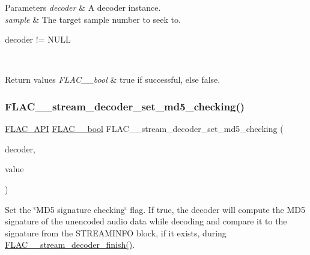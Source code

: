 \begin{DoxyParams}{Parameters}
{\em decoder} & A decoder instance. \\
\hline
{\em sample} & The target sample number to seek to.  
\begin{DoxyCode}
decoder != NULL 
\end{DoxyCode}
 \\
\hline
\end{DoxyParams}

\begin{DoxyRetVals}{Return values}
{\em F\+L\+A\+C\+\_\+\+\_\+bool} & {\ttfamily true} if successful, else {\ttfamily false}. \\
\hline
\end{DoxyRetVals}
\mbox{\label{group__flac__stream__decoder_ga48074d18a17ea88e8272cc8f865ae6e6}} 
\subsubsection{\texorpdfstring{F\+L\+A\+C\+\_\+\+\_\+stream\+\_\+decoder\+\_\+set\+\_\+md5\+\_\+checking()}{FLAC\_\_stream\_decoder\_set\_md5\_checking()}}
{\footnotesize\ttfamily \hyperlink{group__flac__export_ga56ca07df8a23310707732b1c0007d6f5}{F\+L\+A\+C\+\_\+\+A\+PI} \hyperlink{ordinals_8h_a95103469f1cbd78b8cf250194985b34e}{F\+L\+A\+C\+\_\+\+\_\+bool} F\+L\+A\+C\+\_\+\+\_\+stream\+\_\+decoder\+\_\+set\+\_\+md5\+\_\+checking (\begin{DoxyParamCaption}\item[{\hyperlink{struct_f_l_a_c_____stream_decoder}{F\+L\+A\+C\+\_\+\+\_\+\+Stream\+Decoder} $\ast$}]{decoder,  }\item[{\hyperlink{ordinals_8h_a95103469f1cbd78b8cf250194985b34e}{F\+L\+A\+C\+\_\+\+\_\+bool}}]{value }\end{DoxyParamCaption})}

Set the \char`\"{}\+M\+D5 signature checking\char`\"{} flag. If {\ttfamily true}, the decoder will compute the M\+D5 signature of the unencoded audio data while decoding and compare it to the signature from the S\+T\+R\+E\+A\+M\+I\+N\+FO block, if it exists, during \hyperlink{group__flac__stream__decoder_gaa51bb38f762ee11b320a0839f165c5ce}{F\+L\+A\+C\+\_\+\+\_\+stream\+\_\+decoder\+\_\+finish()}.

